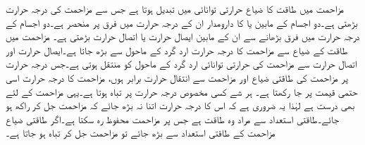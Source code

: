 مزاحمت میں طاقت کا ضیاع حرارتی توانائی میں تبدیل ہوتا ہے جس سے مزاحمت کی درجہ حرارت بڑھتی ہے۔دو اجسام  کے مابین  یا  کا دارومدار ان کے درجہ حرارت میں فرق پر منحصر ہے۔دو اجسام کے درجہ حرارت میں فرق بڑھانے سے ان کے مابین ایصال حرارت یا اتصال حرارت بڑھتی ہے۔  مزاحمت میں طاقت کے ضیاع سے مزاحمت کا درجہ حرارت ارد گرد کے ماحول  سے بڑھ جاتا ہے۔ایصال حرارت اور اتصال حرارت سے مزاحمت کی حرارتی توانائی ارد گرد کے ماحول کو منتقل ہوتی ہے۔جس درجہ حرارت پر مزاحمت کی طاقتی ضیاع اور مزاحمت سے انتقال حرارت برابر ہوں، مزاحمت کا درجہ حرارت اسی حتمی قیمت پر جا رکھتا ہے۔ ہر شے کسی مخصوص درجہ حرارت پر تباہ ہوتا ہے۔یہی مزاحمت کے لئے بھی درست ہے لہٰذا یہ ضروری ہے کہ اس کا درجہ حرارت اتنا نہ بڑھ جائے کہ مزاحمت جل کر راکھ ہو جائے۔طاقتی استعداد سے مراد وہ طاقت ہے جس پر مزاحمت محفوظ رہ سکتا ہے۔اگر طاقتی ضیاع مزاحمت کے طاقتی استعداد سے بڑھ جائے تو مزاحمت جل کر تباہ ہو جاتا ہے۔

